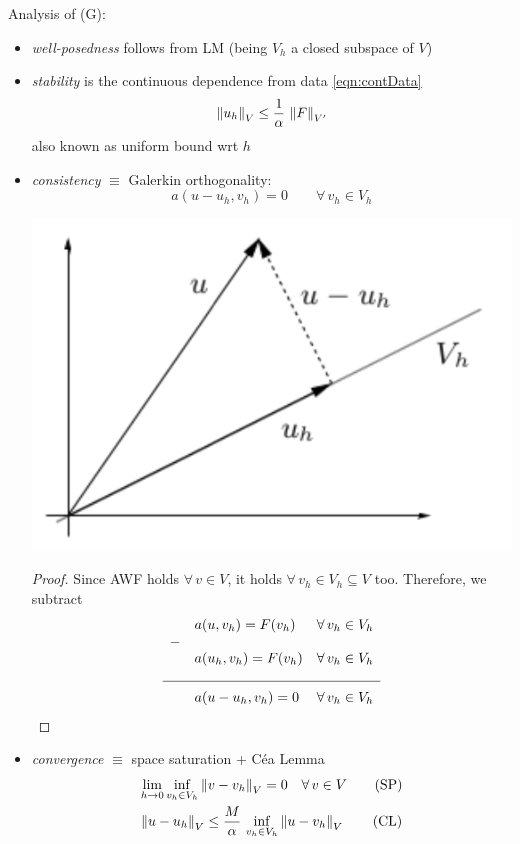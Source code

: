 Analysis of (G):
\begin{itemize}
\item \emph{well-posedness} follows from LM (being $V_h$ a closed subspace of $V$)
\item \emph{stability} is the continuous dependence from data \eqref{eqn:contData}
\begin{equation*}
\left\lVert u_h \right\rVert_V\leq \frac{1}{\alpha}\,\left\lVert F \right\rVert_{V'} 
\end{equation*}
also known as uniform bound wrt $h$

\item \emph{consistency} $\equiv$ Galerkin orthogonality:
\begin{equation*}
a(u-u_h,v_h)=0\qquad\forall\, v_h\in V_h \tag{GO}
\end{equation*}

\begin{Figure}
    \centering
    \includegraphics[width=0.4\linewidth]{images/GO}
\end{Figure}

\begin{proof}
Since AWF holds $\forall\,v\in V$, it holds $\forall\,v_h\in V_h\subseteq V$ too. Therefore, we subtract
\begin{equation*}
\begin{array}{cll}
 & a(u,v_h)=F(v_h) & \forall\,v_h\in V_h \\
- & & \\
 & \underbracket[0pt]{a(u_h,v_h)=F(v_h)}_{\quad} & \forall\,v_h\in V_h \\
\hline
 & \overbracket[0pt]{a(u-u_h,v_h)=0}^{\quad} & \forall\,v_h\in V_h
\end{array} 
\end{equation*}
\end{proof}

\item \emph{convergence} $\equiv$ space saturation + Céa Lemma
\begin{gather*}
\lim_{h\to 0}\inf_{v_h\in V_h}\left\lVert v-v_h \right\rVert_V=0\quad\forall\, v\in V \tag{SP} \\
\left\lVert u-u_h \right\rVert_V\leq \frac{M}{\alpha}\,\inf_{v_h\in V_h}\left\lVert u-v_h \right\rVert_V \tag{CL}
\end{gather*}


\end{itemize}
